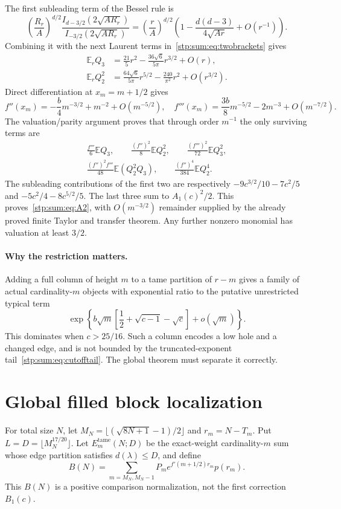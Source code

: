 \documentclass[11pt]{article}
\theoremstyle{remark}\newtheorem{remark}[theorem]{Remark}
\newcommand{\E}{\mathbb E}
\begin{document}
The first subleading term of the Bessel rule is
\[
 \left(\frac{R_r}{A}\right)^{d/2}
 \frac{I_{d-3/2}(2\sqrt{AR_r})}{I_{-3/2}(2\sqrt{AR_r})}
 =\left(\frac rA\right)^{d/2}
 \left(1-\frac{d(d-3)}{4\sqrt{Ar}}+O(r^{-1})\right).
\]
Combining it with the next Laurent terms in~\eqref{stp:sum:eq:twobrackets} gives
\begin{align*}
 \E_rQ_3&=\frac{21}5r^2-\frac{36\sqrt6}{5\pi}r^{3/2}+O(r),\\
 \E_rQ_2^2&=\frac{64\sqrt6}{5\pi}r^{5/2}
                        -\frac{240}{\pi^2}r^2+O(r^{3/2}).
\end{align*}
Direct differentiation at $x_m=m+1/2$ gives
\[
 f''(x_m)=-\frac b4m^{-3/2}+m^{-2}+O(m^{-5/2}),\quad
 f'''(x_m)=\frac{3b}8m^{-5/2}-2m^{-3}+O(m^{-7/2}).
\]
The valuation/parity argument proves that through order $m^{-1}$ the only surviving terms are
\begin{gather*}
 \frac{f'''}6\E Q_3,\qquad \frac{(f'')^2}{8}\E Q_2^2,\qquad
 \frac{(f''')^2}{72}\E Q_3^2,\\
 \frac{(f'')^2f'''}{48}\E(Q_2^2Q_3),\qquad
 \frac{(f'')^4}{384}\E Q_2^4.
\end{gather*}
The subleading contributions of the first two are respectively
$-9c^{3/2}/10-7c^2/5$ and $-5c^2/4-8c^{5/2}/5$. The last three sum to $A_1(c)^2/2$. This proves~\eqref{stp:sum:eq:A2}, with $O(m^{-3/2})$ remainder supplied by the already proved finite Taylor and transfer theorem. Any further nonzero monomial has valuation at least $3/2$.

\paragraph{Why the restriction matters.}
Adding a full column of height $m$ to a tame partition of $r-m$ gives a family of actual cardinality-$m$ objects with exponential ratio to the putative unrestricted typical term
\[
 \exp\left\{b\sqrt m\left[\frac12+\sqrt{c-1}-\sqrt c\right]+o(\sqrt m)\right\}.
\]
This dominates when $c>25/16$. Such a column encodes a low hole and a changed edge, and is not bounded by the truncated-exponent tail~\eqref{stp:sum:eq:cutofftail}. The global theorem must separate it correctly.

\section{Global filled block localization}
\label{stp:sum:sec:global}
For total size $N$, let $M_N=\lfloor(\sqrt{8N+1}-1)/2\rfloor$ and $r_m=N-T_m$. Put $L=D=\lfloor M_N^{17/20}\rfloor$. Let $E_m^{\mathrm{tame}}(N;D)$ be the exact-weight cardinality-$m$ sum whose edge partition satisfies $d(\lambda)\le D$, and define
\begin{equation}\label{stp:sum:eq:BN}
 B(N)=\sum_{m=M_N,M_N-1}P_m e^{f'(m+1/2)r_m}p(r_m).
\end{equation}
This $B(N)$ is a positive comparison normalization, not the first correction $B_1(c)$.
\end{document}
